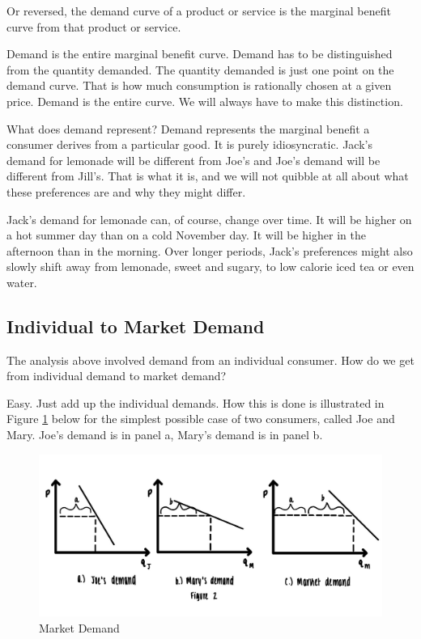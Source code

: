 \documentclass[
]{book}
\begin{document}
Or reversed, the demand curve of a product or service is the marginal benefit curve from that product or service.

Demand is the entire marginal benefit curve. Demand has to be distinguished from the quantity demanded. The quantity demanded is just one point on the demand curve. That is how much consumption is rationally chosen at a given price. Demand is the entire curve. We will always have to make this distinction.

What does demand represent? Demand represents the marginal benefit a consumer derives from a particular good. It is purely idiosyncratic. Jack's demand for lemonade will be different from Joe's and Joe's demand will be different from Jill's. That is what it is, and we will not quibble at all about what these preferences are and why they might differ.

Jack's demand for lemonade can, of course, change over time. It will be higher on a hot summer day than on a cold November day. It will be higher in the afternoon than in the morning. Over longer periods, Jack's preferences might also slowly shift away from lemonade, sweet and sugary, to low calorie iced tea or even water.

\hypertarget{individual-to-market-demand}{%
\subsection{Individual to Market Demand}\label{individual-to-market-demand}}

The analysis above involved demand from an individual consumer. How do we get from individual demand to market demand?

Easy. Just add up the individual demands. How this is done is illustrated in Figure \ref{fig:demand03} below for the simplest possible case of two consumers, called Joe and Mary. Joe's demand is in panel a, Mary's demand is in panel b.

\begin{figure}

{\centering \includegraphics[width=1\linewidth]{img/demand/fig3} 

}

\caption{Market Demand}\label{fig:demand03}
\end{figure}
\end{document}

